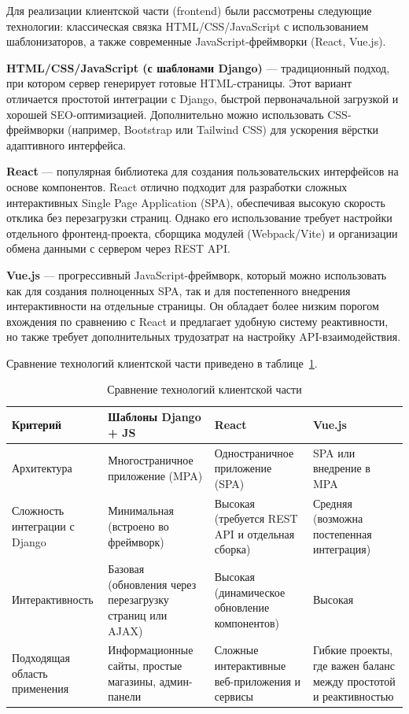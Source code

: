 Для реализации клиентской части (frontend) были рассмотрены следующие технологии: классическая связка HTML/CSS/JavaScript с использованием шаблонизаторов, а также современные JavaScript-фреймворки (React, Vue.js).

\textbf{HTML/CSS/JavaScript (с шаблонами Django)} --- традиционный подход, при котором сервер генерирует готовые HTML-страницы. Этот вариант отличается простотой интеграции с Django, быстрой первоначальной загрузкой и хорошей SEO-оптимизацией. Дополнительно можно использовать CSS-фреймворки (например, Bootstrap или Tailwind CSS) для ускорения вёрстки адаптивного интерфейса. 

\textbf{React} --- популярная библиотека для создания пользовательских интерфейсов на основе компонентов. React отлично подходит для разработки сложных интерактивных Single Page Application (SPA), обеспечивая высокую скорость отклика без перезагрузки страниц. Однако его использование требует настройки отдельного фронтенд-проекта, сборщика модулей (Webpack/Vite) и организации обмена данными с сервером через REST API.

\textbf{Vue.js} --- прогрессивный JavaScript-фреймворк, который можно использовать как для создания полноценных SPA, так и для постепенного внедрения интерактивности на отдельные страницы. Он обладает более низким порогом вхождения по сравнению с React и предлагает удобную систему реактивности, но также требует дополнительных трудозатрат на настройку API-взаимодействия.

Сравнение технологий клиентской части приведено в таблице~\ref{tab:frontend_compare}.

\begin{table}[H]
    \centering
    \caption{Сравнение технологий клиентской части}
    \label{tab:frontend_compare}
    \small
    \begin{tabular}{|p{3cm}|p{3.6cm}|p{3.6cm}|p{3.6cm}|}
        \hline
        \textbf{Критерий} & \textbf{Шаблоны Django + JS} & \textbf{React} & \textbf{Vue.js} \\ \hline
        Архитектура & Многостраничное приложение (MPA) & Одностраничное приложение (SPA) & SPA или внедрение в MPA \\ \hline
        Сложность интеграции с Django & Минимальная (встроено во фреймворк) & Высокая (требуется REST API и отдельная сборка) & Средняя (возможна постепенная интеграция) \\ \hline
        Интерактивность & Базовая (обновления через перезагрузку страниц или AJAX) & Высокая (динамическое обновление компонентов) & Высокая \\ \hline
        Подходящая область применения & Информационные сайты, простые магазины, админ-панели & Сложные интерактивные веб-приложения и сервисы & Гибкие проекты, где важен баланс между простотой и реактивностью \\ \hline
    \end{tabular}
\end{table}

